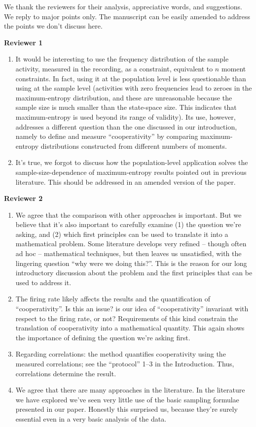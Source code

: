 \documentclass{article}
\begin{document}
We thank the reviewers for their analysis, appreciative words, and
suggestions. We reply to major points only. The manuscript can be easily
amended to address the points we don't discuss here.

\textbf{Reviewer 1}
\begin{enumerate}
\item It would be interesting to use the frequency distribution of the
  sample activity, measured in the recording, as a constraint, equivalent
  to $n$ moment constraints. In fact, using it at the population level is
  less questionable than using at the sample level (activities with zero
  frequencies lead to zeroes in the maximum-entropy distribution, and these
  are unreasonable because the sample size is much smaller than the
  state-space size. This indicates that maximum-entropy is used beyond its
  range of validity). Its use, however, addresses a different question than
  the one discussed in our introduction, namely to define and measure
  \enquote{cooperativity} by comparing maximum-entropy distributions
  constructed from different numbers of moments.
\item It's true, we forgot to discuss how the population-level application
  solves the sample-size-dependence of maximum-entropy results pointed out in
  previous literature. This should be addressed in an amended version of
  the paper.
\end{enumerate}

\bigskip

\textbf{Reviewer 2}
\begin{enumerate}
\item We agree that the comparison with other approaches is important. But
  we believe that it's also important to carefully examine (1) the question
  we're asking, and (2) which first principles can be used to translate it
  into a mathematical problem. Some literature develops very refined --
  though often ad hoc -- mathematical techniques, but then leaves us
  unsatisfied, with the lingering question \enquote{why were we doing
    this?}. This is the reason for our long introductory discussion about
  the problem and the first principles that can be used to address it.
\item The firing rate likely affects the results and the quantification of
  \enquote{cooperativity}. Is this an issue? is our idea of
  \enquote{cooperativity} invariant with respect to the firing rate, or
  not? Requirements of this kind constrain the translation of cooperativity
  into a mathematical quantity. This again shows the importance of defining
  the question we're asking first.
\item Regarding correlations: the method quantifies cooperativity using the
  measured correlations; see the \enquote{protocol} 1--3 in the
  Introduction. Thus, correlations determine the result.
\item We agree that there are many approaches in the literature. In the
  literature we have explored we've seen very little use of the basic
  sampling formulae presented in our paper. Honestly this surprised us,
  because they're surely essential even in a very basic analysis of the data.
\end{enumerate}
\end{document}
